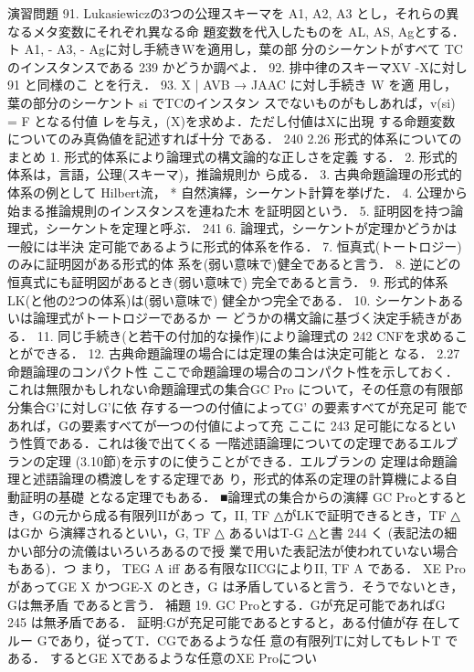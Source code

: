 \documentclass{ltjsarticle}
\theoremstyle{mystyle1}
\theoremstyle{mystyle2}
\begin{document}
演習問題 91. Lukasiewiczの3つの公理スキーマを A1, A2, A3
とし，それらの異なるメタ変数にそれぞれ異なる命 題変数を代入したものを AL, AS, Agとする． ト A1, - A3, - Agに対し手続きWを適用し，葉の部 分のシーケントがすべて TCのインスタンスである
239
かどうか調べよ． 92. 排中律のスキーマXV -Xに対し 91 と同様のこ
とを行え． 93. X | AVB → JAAC に対し手続き W を適 用し，葉の部分のシーケント si でTCのインスタン スでないものがもしあれば，v(si) = F となる付値 レを与え，(X)を求めよ．ただし付値はXに出現 する命題変数についてのみ真偽値を記述すれば十分 である．
240
2.26 形式的体系についてのまとめ 1. 形式的体系により論理式の構文論的な正しさを定義
する． 2. 形式的体系は，言語，公理(スキーマ)，推論規則か
ら成る． 3. 古典命題論理の形式的体系の例として Hilbert流， * 自然演繹，シーケント計算を挙げた．
4. 公理から始まる推論規則のインスタンスを連ねた木  を証明図という． 5. 証明図を持つ論理式，シーケントを定理と呼ぶ．
241
6. 論理式，シーケントが定理かどうかは一般には半決
定可能であるように形式的体系を作る． 7. 恒真式(トートロジー)のみに証明図がある形式的体
系を(弱い意味で)健全であると言う． 8. 逆にどの恒真式にも証明図があるとき(弱い意味で)
完全であると言う． 9. 形式的体系LK(と他の2つの体系)は(弱い意味で)
健全かつ完全である． 10. シーケントあるいは論理式がトートロジーであるか
ー どうかの構文論に基づく決定手続きがある． 11. 同じ手続き(と若干の付加的な操作)により論理式の
242
CNFを求めることができる． 12. 古典命題論理の場合には定理の集合は決定可能と
なる．
2.27 命題論理のコンパクト性 ここで命題論理の場合のコンパクト性を示しておく． これは無限かもしれない命題論理式の集合GC Pro について，その任意の有限部分集合G'に対しG'に依 存する一つの付値によってG' の要素すべてが充足可 能であれば，Gの要素すべてが一つの付値によって充
ここに
243
足可能になるという性質である．これは後で出てくる 一階述語論理についての定理であるエルブランの定理 (3.10節)を示すのに使うことができる．エルブランの 定理は命題論理と述語論理の橋渡しをする定理であ
り，形式的体系の定理の計算機による自動証明の基礎 となる定理でもある．
■論理式の集合からの演繹
GC Proとするとき，Gの元から成る有限列IIがあっ て，II, TF △がLKで証明できるとき，TF △はGか ら演繹されるといい，G, TF △ あるいはT-G △と書
244
く (表記法の細かい部分の流儀はいろいろあるので授 業で用いた表記法が使われていない場合もある)．つ まり，
TEG A iff ある有限なIICGによりII, TF A
である． XE ProがあってGE X かつGE-X のとき，G は矛盾していると言う．そうでないとき，Gは無矛盾 であると言う．
補題 19. GC Proとする．Gが充足可能であればG
245
は無矛盾である．
証明:Gが充足可能であるとすると，ある付値が存 在してルー Gであり，従ってT．CGであるような任 意の有限列Tに対してもレトT である． するとGE Xであるような任意のXE Proについ
\end{document}
